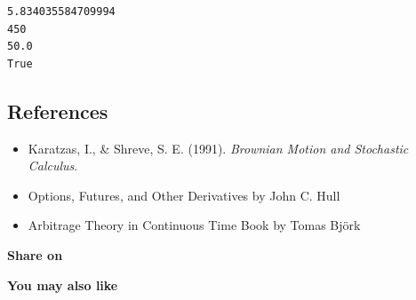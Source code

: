 \documentclass[
  letterpaper,
  DIV=11,
  numbers=noendperiod]{scrartcl}
\providecommand{\tightlist}{%
  \setlength{\itemsep}{0pt}\setlength{\parskip}{0pt}}
\begin{document}
\begin{verbatim}
5.834035584709994
450
50.0
True
\end{verbatim}

\subsection{References}\label{references}

\begin{itemize}
\tightlist
\item
  Karatzas, I., \& Shreve, S. E. (1991). \emph{Brownian Motion and
  Stochastic Calculus}.\\
\item
  Options, Futures, and Other Derivatives by John C. Hull\\
\item
  Arbitrage Theory in Continuous Time Book by Tomas Björk
\end{itemize}

\textbf{Share on}




\protect{}\label{fb-root}

\textbf{You may also like}


\printbibliography
\end{document}
